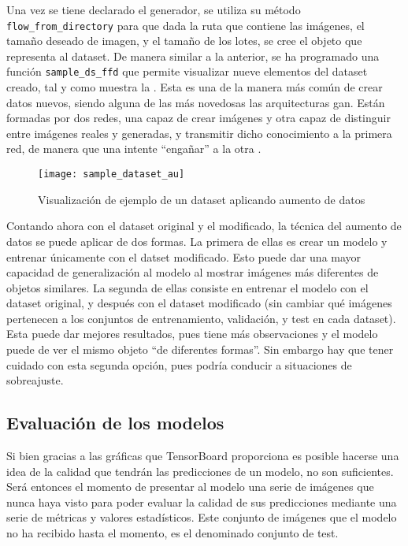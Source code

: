 			Una vez se tiene declarado el generador, se utiliza su método \texttt{flow\_from\_directory} para que dada la ruta que contiene las imágenes, el tamaño deseado de imagen, y el tamaño de los lotes, se cree el objeto que representa al dataset. De manera similar a la anterior, se ha programado una función \texttt{sample\_ds\_ffd} que permite visualizar nueve elementos del dataset creado, tal y como muestra la . Esta es una de la manera más común de crear datos nuevos, siendo alguna de las más novedosas las arquitecturas \gls{gan}. Están formadas por dos redes, una capaz de crear imágenes y otra capaz de distinguir entre imágenes reales y generadas, y transmitir dicho conocimiento a la primera red, de manera que una intente ``engañar'' a la otra \cite{gan}. \\
			
			\begin{figure}
				\centering
				\texttt{[image: sample\_dataset\_au]}
				\caption{Visualización de ejemplo de un dataset aplicando aumento de datos}
				\label{fig:sample_dataset_au}
			\end{figure}
			
			Contando ahora con el dataset original y el modificado, la técnica del aumento de datos se puede aplicar de dos formas. La primera de ellas es crear un modelo y entrenar únicamente con el datset modificado. Esto puede dar una mayor capacidad de generalización al modelo al mostrar imágenes más diferentes de objetos similares. La segunda de ellas consiste en entrenar el modelo con el dataset original, y después con el dataset modificado (sin cambiar qué imágenes pertenecen a los conjuntos de entrenamiento, validación, y test en cada dataset). Esta puede dar mejores resultados, pues tiene más observaciones y el modelo puede de ver el mismo objeto ``de diferentes formas''. Sin embargo hay que tener cuidado con esta segunda opción, pues podría conducir a situaciones de sobreajuste. 
			
		\subsection{Evaluación de los modelos}
		
			Si bien gracias a las gráficas que TensorBoard proporciona es posible hacerse una idea de la calidad que tendrán las predicciones de un modelo, no son suficientes. Será entonces el momento de presentar al modelo una serie de imágenes que nunca haya visto para poder evaluar la calidad de sus predicciones mediante una serie de métricas y valores estadísticos. Este conjunto de imágenes que el modelo no ha recibido hasta el momento, es el denominado conjunto de test. \\
			
